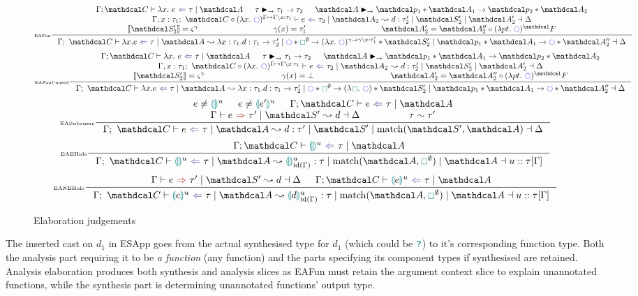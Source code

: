 \begin{figure}[H]
\tiny
\[\inference[\tiny EAFun]{\analysisslice{\C}{\lambda x.\ e}{\tau}{\A} & \tau \funmatch \tau_1 \to \tau_2  & \A \funmatch \p_1 * \A_1 \to \p_2 * \A_2\\ \elaborationAnalysisSlice[\Gamma,x:\tau_1]{\C \circ (\lambda x.\ \cmark)^{\Gamma \mapsto \Gamma\backslash x: \tau_1}}{e}{\tau_2}{\A_2}{d}{\tau_2'}{\S_2' \mid \A_2'}{\Delta} \\ \type{\S_2'} = \varsigma ^ \gamma & \gamma(x) = \tau_1' & \A_2' = \A_2'' \circ (\lambda pt.\ \cmark)^\F}{\elaborationAnalysisSlice{\C}{\lambda x. e}{\tau}{\A}{\lambda x:\tau_1. d}{\tau_1 \to \tau_2'}{\cmark*\gap^\emptyset \to (\lambda x.\ \cmark)^{\gamma \to \gamma\backslash x : \tau_1'} *\S_2'\mid\p_1 * \A_1 \to \cmark * \A_2''}{\Delta}}\]\[\inference[\tiny EAFunUnused]{\analysisslice{\C}{\lambda x.\ e}{\tau}{\A} & \tau \funmatch \tau_1 \to \tau_2  & \A \funmatch \p_1 * \A_1 \to \p_2 * \A_2\\ \elaborationAnalysisSlice[\Gamma,x:\tau_1]{\C \circ (\lambda x.\ \cmark)^{\Gamma \mapsto \Gamma\backslash x: \tau_1}}{e}{\tau_2}{\A_2}{d}{\tau_2'}{\S_2' \mid \A_2'}{\Delta} \\ \type{\S_2'} = \varsigma ^ \gamma & \gamma(x) = \bot & \A_2' = \A_2'' \circ (\lambda pt.\ \cmark)^\F}{\elaborationAnalysisSlice{\C}{\lambda x. e}{\tau}{\A}{\lambda x:\tau_1. d}{\tau_1 \to \tau_2'}{\cmark*\gap^\emptyset \to (\lambda \gap.\ \cmark) *\S_2'\mid\p_1 * \A_1 \to \cmark * \A_2''}{\Delta}}\]
\[\inference[\tiny EASubsume]{e \neq \hole^u & e \neq \hole[e']^u & \analysisslice{\C}{e}{\tau}{\A}\\ \elaborationSynthesisSlice{e}{\tau'}{\S'}{d}{\Delta} & \tau \sim \tau'}{\elaborationAnalysisSlice{\C}{e}{\tau}{\A}{d}{\tau'}{\S' \mid \mathrm{match}(\S', \A)}{\Delta}}\]
\[\inference[\tiny EAEHole]{\analysisslice{\C}{\hole^u}{\tau}{\A}}{\elaborationAnalysisSlice{\C}{\hole^u}{\tau}{\A}{\hole^u_{\mathrm{id}(\Gamma)}}{\tau}{\mathrm{match}(\A, \gap^\emptyset) \mid \A}{u::\tau[\Gamma]}}\]
\[\inference[\tiny EANEHole]{\elaborationSynthesisSlice{e}{\tau'}{\S'}{d}{\Delta} & \analysisslice{\C}{\hole[e]^u}{\tau}{\A}}{\elaborationAnalysisSlice{\C}{\hole[e]^u}{\tau}{\A}{\hole[d]^u_{\mathrm{id}(\Gamma)}}{\tau}{\mathrm{match}(\A, \gap^\emptyset)\mid \A}{u::\tau[\Gamma]}}\]

\caption{Elaboration judgements} 
\label{fig:elaboration}
\end{figure}
The inserted cast on $d_1$ in ESApp goes from the actual synthesised type for $d_1$ (which could be ${\color{teal}\texttt{?}}$) to it's corresponding function type. Both the analysis part requiring it to be \textit{a function} (any function) and the parts specifying its component types if synthesised are retained. Analysis elaboration produces both synthesis and analysis slices as EAFun must retain the argument context slice to explain unannotated functions, while the synthesis part is determining unannotated functions' output type.
